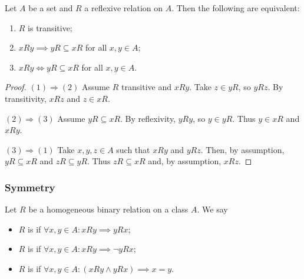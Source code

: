 \begin{lemma} \label{transitivityReflexiveRelationLemma}
Let $A$ be a set and $R$ a reflexive relation on $A$. Then the following are equivalent:
\begin{enumerate}
\item $R$ is transitive;
\item $xRy \implies yR\subseteq xR$ for all $x,y\in A$;
\item $xRy \iff yR\subseteq xR$ for all $x,y\in A$.
\end{enumerate}
\end{lemma}
\begin{proof}
$(1) \Rightarrow (2)$ Assume $R$ transitive and $xRy$. Take $z\in yR$, so $yRz$. By transitivity, $xRz$ and $z\in xR$.

$(2) \Rightarrow (3)$ Assume $yR \subseteq xR$. By reflexivity, $yRy$, so $y\in yR$. Thus $y\in xR$ and $xRy$.

$(3) \Rightarrow (1)$ Take $x,y,z\in A$ such that $xRy$ and $yRz$. Then, by assumption, $yR \subseteq xR$ and $zR \subseteq yR$. Thus $zR \subseteq xR$ and, by assumption, $xRz$.
\end{proof}

\subsubsection{Symmetry}
\begin{definition}
Let $R$ be a homogeneous binary relation on a class $A$. We say
\begin{itemize}
\item $R$ is  if $\forall x,y\in A: xRy \implies yRx$;
\item $R$ is  if $\forall x,y\in A: xRy \implies \neg yRx$;
\item $R$ is  if $\forall x,y\in A: (xRy\land yRx) \implies x=y$.
\end{itemize}
\end{definition}

